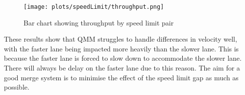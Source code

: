\begin{figure}[htb]
\texttt{[image: plots/speedLimit/throughput.png]}
\caption{Bar chart showing throughput by speed limit pair}
\label{fig:throughputSpeedLimit}
\end{figure}

These results show that QMM struggles to handle differences in velocity well, with the faster lane being impacted more heavily than the slower lane. This is because the faster lane is forced to slow down to accommodate the slower lane. There will always be delay on the faster lane due to this reason. The aim for a good merge system is to minimise the effect of the speed limit gap as much as possible.


